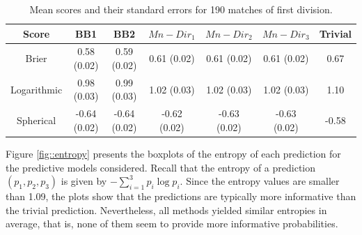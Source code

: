 \documentclass[journal,article,accept,moreauthors,pdftex,12pt,a4paper]{mdpi}
\begin{document}
    \begin{table}[H]
        \begin{center}
            \begin{tabular}{ccccccc}
                \hline
                Score & BB1 & BB2 & $Mn-Dir_1$ & $Mn-Dir_2$ & $Mn-Dir_3$ & Trivial \\
                \hline
                \hline
                Brier &0.58 (0.02) & 0.59 (0.02)& 0.61 (0.02)& 0.61 (0.02) & 0.61  (0.02) & 0.67 \\
                Logarithmic & 0.98 (0.03) & 0.99 (0.03) & 1.02 (0.03)  & 1.02 (0.03)  & 1.02 (0.03) & 1.10  \\
                Spherical &  -0.64 (0.02)& -0.64 (0.02)& -0.62 (0.02)& -0.63 (0.02)& -0.63 (0.02)& -0.58\\
                \hline
            \end{tabular}
            \caption{Mean scores and their standard errors for 190 matches of first division.}
            \label{tab::brier}
        \end{center}
    \end{table}


    Figure \ref{fig::entropy} presents the boxplots of the entropy of each prediction for the predictive models considered. {\color{red} Recall
        that the entropy of a prediction $(p_1,p_2,p_3)$ is given by $- \sum_{i=1}^3 p_i \log{p_i}$.}
    Since the entropy values are smaller than 1.09, the plots show that the predictions
    are typically more informative than the trivial prediction. Nevertheless, all methods yielded similar entropies in average, that is,
    none of them seem to provide more informative probabilities.
\end{document}
